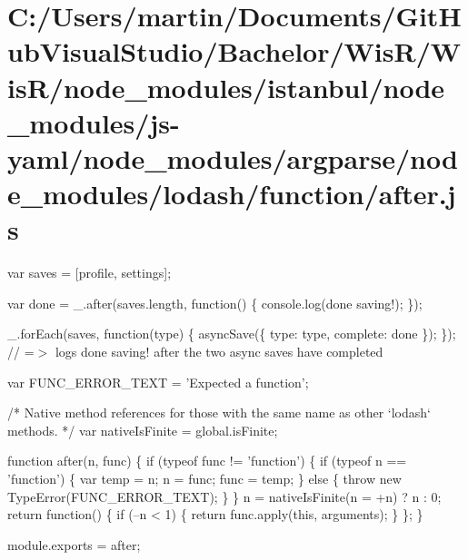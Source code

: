 \hypertarget{_c_1_2_users_2martin_2_documents_2_git_hub_visual_studio_2_bachelor_2_wis_r_2_wis_r_2node_module7060d93eed0cfff7c6ea6189eee42c7d}{}\section{C\+:/\+Users/martin/\+Documents/\+Git\+Hub\+Visual\+Studio/\+Bachelor/\+Wis\+R/\+Wis\+R/node\+\_\+modules/istanbul/node\+\_\+modules/js-\/yaml/node\+\_\+modules/argparse/node\+\_\+modules/lodash/function/after.\+js}
var saves = \mbox{[}\textquotesingle{}profile\textquotesingle{}, \textquotesingle{}settings\textquotesingle{}\mbox{]};

var done = \+\_\+.\+after(saves.\+length, function() \{ console.\+log(\textquotesingle{}done saving!\textquotesingle{}); \});

\+\_\+.\+for\+Each(saves, function(type) \{ async\+Save(\{ \textquotesingle{}type\textquotesingle{}\+: type, \textquotesingle{}complete\textquotesingle{}\+: done \}); \}); // =$>$ logs \textquotesingle{}done saving!\textquotesingle{} after the two async saves have completed


\begin{DoxyCodeInclude}

var FUNC\_ERROR\_TEXT = \textcolor{stringliteral}{'Expected a function'};

\textcolor{comment}{/* Native method references for those with the same name as other `lodash` methods. */}
var nativeIsFinite = global.isFinite;

\textcolor{keyword}{function} after(n, func) \{
  \textcolor{keywordflow}{if} (typeof func != \textcolor{stringliteral}{'function'}) \{
    \textcolor{keywordflow}{if} (typeof n == \textcolor{stringliteral}{'function'}) \{
      var temp = n;
      n = func;
      func = temp;
    \} \textcolor{keywordflow}{else} \{
      \textcolor{keywordflow}{throw} \textcolor{keyword}{new} TypeError(FUNC\_ERROR\_TEXT);
    \}
  \}
  n = nativeIsFinite(n = +n) ? n : 0;
  \textcolor{keywordflow}{return} \textcolor{keyword}{function}() \{
    \textcolor{keywordflow}{if} (--n < 1) \{
      \textcolor{keywordflow}{return} func.apply(\textcolor{keyword}{this}, arguments);
    \}
  \};
\}

module.exports = after;
\end{DoxyCodeInclude}
 